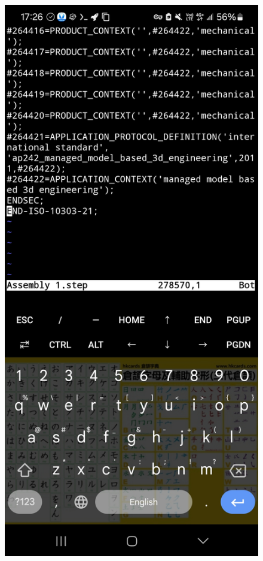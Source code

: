 \documentclass[a4paper,12pt]{article}
\begin{document}
\begin{center}\begin{figure}[H]\centering
\hfill
\begin{minipage}[t]{0.45\textwidth}
\centering
\includegraphics[width=\textwidth]{./working_screenshots/3.jpg}

\end{minipage}
\end{figure}
\end{center}
\end{document}
